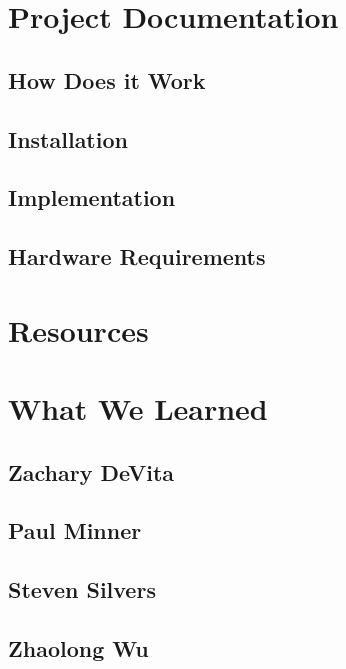 \documentclass[10pt,letterpaper,onecolumn,draftclsnofoot,journal]{IEEEtran}
\begin{document}
\section{\textbf{Project Documentation}}


\subsection{\textbf{How Does it Work}}


\subsection{\textbf{Installation}}


\subsection{\textbf{Implementation}}


\subsection{\textbf{Hardware Requirements}}



\section{\textbf{Resources}}



\section{\textbf{What We Learned}}

\subsection{\textbf{Zachary DeVita}}

\subsection{\textbf{Paul Minner}}

\subsection{\textbf{Steven Silvers}}

\subsection{\textbf{Zhaolong Wu}}
\end{document}
